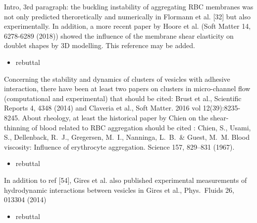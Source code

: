 \documentclass[11pt]{article}
\newcommand{\comment}[1]{{\color{blue} #1}}
\begin{document}
\noindent
\comment{Intro, 3rd paragraph: the buckling instability of aggregating RBC
membranes was not only predicted theroretically and numerically in
Flormann et al. [32] but also experimentally. In addition, a more
recent paper by Hoore et al. (Soft Matter 14, 6278-6289 (2018)) showed
the influence of the membrane shear elasticity on doublet shapes by 3D
modelling. This reference may be added.}
\begin{itemize}
  \item rebuttal
\end{itemize}

\noindent
\comment{Concerning the stability and dynamics of clusters of vesicles with
adhesive interaction, there have been at least two papers on clusters
in micro-channel flow (computational and experimental) that should be
cited: Brust et al., Scientific Reports 4, 4348 (2014) and Claveria et
al., Soft Matter. 2016 vol 12(39):8235-8245. About rheology, at least
the historical paper by Chien on the shear-thinning of blood related
to RBC aggregation should be cited : Chien, S., Usami, S., Dellenback,
R.~J., Gregersen, M.~I., Nanninga, L.~B.~\& Guest, M.~M. Blood
viscosity: Influence of erythrocyte aggregation. Science 157, 829–831
(1967).}
\begin{itemize}
  \item rebuttal
\end{itemize}

\noindent
\comment{In addition to ref [54], Gires et al. also published experimental
measurements of hydrodynamic interactions between vesicles in Gires et
al., Phys.~Fluids 26, 013304 (2014)}
\begin{itemize}
  \item rebuttal
\end{itemize}
\end{document}
